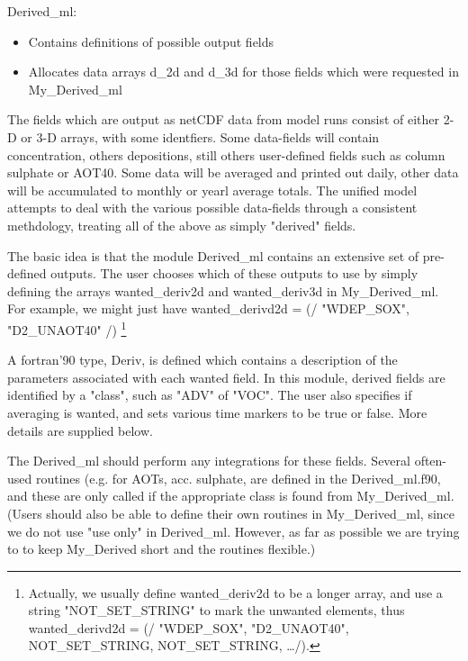 Derived\_ml:\\
\begin{itemize}
  \item Contains definitions of possible output fields
  \item Allocates data arrays d\_2d and d\_3d for those
    fields which were requested in My\_Derived\_ml	
\end{itemize}



\noindent
The fields which are output as netCDF data from model runs consist
of either 2-D or 3-D  arrays, with some identfiers. 
Some data-fields will contain concentration, others depositions, still
others user-defined fields such as column sulphate or AOT40.
Some data will be averaged and printed out daily, other data will
be accumulated to monthly or yearl average totals.
The unified model 
attempts to deal with the various possible data-fields through
a consistent methdology, treating all of the above as simply "derived"
fields.

The basic idea is that  the module Derived\_ml contains an extensive
set of pre-defined outputs. The user chooses which of these
outputs to use by simply defining the arrays wanted\_deriv2d
and wanted\_deriv3d in My\_Derived\_ml.  For example,
we might just have wanted\_derivd2d = (/ "WDEP\_SOX", "D2\_UNAOT40" /)
\footnote{Actually, we usually define wanted\_deriv2d to be
a longer array, and use a string "NOT\_SET\_STRING" to mark
the unwanted elements, thus wanted\_derivd2d = 
(/ "WDEP\_SOX", "D2\_UNAOT40", NOT\_SET\_STRING, NOT\_SET\_STRING, \dots /).
}




A fortran'90 type, Deriv, is defined which contains
a description of the parameters associated with each wanted field.
In this module, derived fields are identified by a "class", such as "ADV" of "VOC".
The user also specifies if averaging is wanted, and sets various
time markers to be true or false. More details are supplied below.

 The Derived\_ml should perform any integrations for these fields.
 Several often-used routines (e.g. for AOTs, acc. sulphate, are defined 
 in the Derived\_ml.f90, and these are only called if the appropriate
 class is found from My\_Derived\_ml. (Users should also be
 able to define their own routines in My\_Derived\_ml, since
 we do not use "use only" in Derived\_ml. However, as far as possible
 we are trying to to keep My\_Derived short and the routines flexible.)

